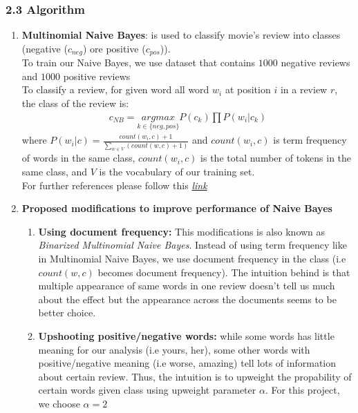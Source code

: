 \documentclass[]{article}
\begin{document}
\subsubsection{2.3 Algorithm}
\begin{enumerate}
	\item 
 	\textbf{Multinomial Naive Bayes}: is used to classify movie's review into classes  (negative ($c_{neg}$) ore positive ($c_{pos}$)).\\
	To train our Naive Bayes, we use dataset that contains $1000$ negative reviews and $1000$ positive reviews\\
	To classify a review, for given word all word $w_i$ at position $i$ in a review $r$, the class of the review is:\\
		\begin{equation*}
		 	\begin{split}
		 		c_{NB} = \underset{k \in \{neg,pos\}}{argmax} P(c_{k})\prod P(w_i|c_{k})
		 	\end{split}
	 	\end{equation*}
	 where $P(w_i|c) = \displaystyle \frac{count(w_i,c)+1}{\sum_{w\in {V}}(count(w,c)+1)}$ and $count(w_i,c)$ is term frequency of words in the same class, $count(w_i,c)$ is the total number of tokens in the same class, and $V$ is the vocabulary of our training set.\\
	 
	 For further references please follow this \href{http://nlp.stanford.edu/IR-book/html/htmledition/naive-bayes-text-classification-1.html}{\textit{link}}
	\item 
	 \textbf{Proposed modifications to improve performance of Naive Bayes}
		\begin{enumerate}
			\item \textbf{Using document frequency: } This modifications is also known as \textit{Binarized Multinomial Naive Bayes}. Instead of using term frequency like in Multinomial Naive Bayes, we use document frequency in the class (i.e $count(w,c)$ becomes document frequency). The intuition behind is that multiple appearance of same words in one review doesn't tell us much about the effect but the appearance across the documents seems to be better choice. 
			\item \textbf{Upshooting positive/negative words:} while some words has little meaning for our analysis (i.e yours, her), some other words with positive/negative meaning (i.e worse, amazing) tell lots of information about certain review. Thus, the intuition is to upweight the propability of certain words given class using upweight parameter $\alpha$. For this project, we choose $\alpha = 2$
		\end{enumerate}
\end{enumerate}
\end{document}
